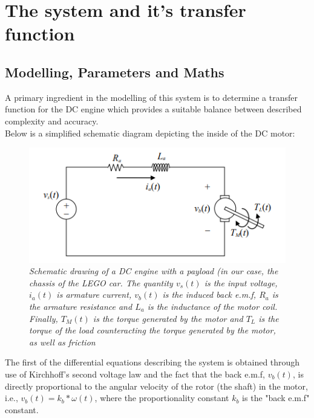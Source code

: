 \documentclass[a4paper,onecolumn,amsmath,amssymb]{revtex4-1}
\begin{document}
\section{\textbf{The system and it's transfer function}}
\subsection{\textbf{Modelling, Parameters and Maths}}
A primary ingredient in the modelling of this system is to determine a transfer function for the DC engine which provides a suitable balance between described complexity and accuracy.\\ 

Below is a simplified schematic diagram depicting the inside of the DC motor:\\

\FloatBarrier
\begin{figure}
\includegraphics[width=\textwidth]{DCMotor_with_load.png}
\caption{\textit{Schematic drawing of a DC engine with a payload (in our case, the chassis of the LEGO car. The quantity $v_s (t)$ is the input voltage, $i_a (t)$ is armature current, $v_b(t)$ is the induced back e.m.f, $R_a$ is the armature resistance and $L_a$ is the inductance of the motor coil. Finally, $T_M (t)$ is the torque generated by the motor and $T_L $ is the torque of the load counteracting the torque generated by the motor, as well as friction }\label{fig:dcmotorwithload}}
\end{figure}
\FloatBarrier

The first of the differential equations describing the system is obtained through use of Kirchhoff's second voltage law and the fact that the back e.m.f, $v_b (t)$, is directly proportional to the angular velocity of the rotor (the shaft) in the motor, i.e., $v_b (t)=k_b * \omega (t)$, where the proportionality constant $k_b$ is the "back e.m.f" constant. \\
\end{document}
